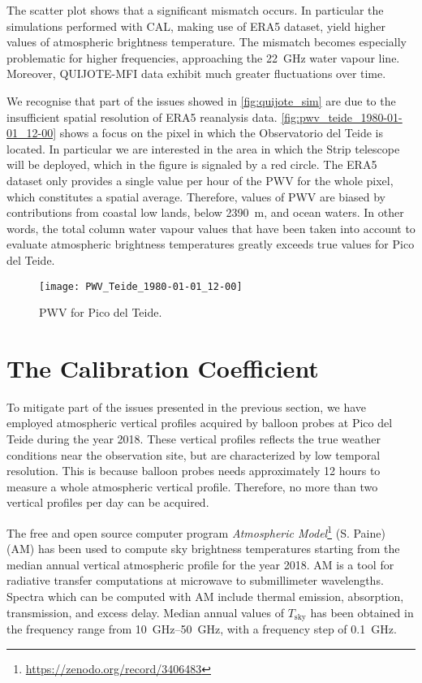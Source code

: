 The scatter plot shows that a significant mismatch occurs. In particular
the simulations performed with CAL, making use of ERA5 dataset, yield higher
values of atmospheric brightness temperature. The mismatch becomes
especially problematic for higher frequencies, approaching the
\SI{22}{\giga\hertz} water vapour line. Moreover, QUIJOTE-MFI data
exhibit much greater fluctuations over time.

We recognise that part of the issues showed in \autoref{fig:quijote_sim}
are due to the insufficient spatial resolution of ERA5 reanalysis data.
\autoref{fig:pwv_teide_1980-01-01_12-00} shows a focus on the pixel in
which the Observatorio del Teide is located. In particular we are
interested in the area in which the Strip telescope will be deployed, which
in the figure is signaled by a red circle. The ERA5 dataset only provides a
single value per hour of the PWV for the whole pixel, which constitutes a
spatial average.  Therefore, values of PWV are biased by contributions from
coastal low lands, below \SI{2390}{\meter}, and ocean waters. In other
words, the total column water vapour values that have been taken into
account to evaluate atmospheric brightness temperatures greatly exceeds
true values for Pico del Teide.

\begin{figure}
        \centering
        \texttt{[image: PWV\_Teide\_1980-01-01\_12-00]}
        \caption{PWV for Pico del Teide.}
        \label{fig:pwv_teide_1980-01-01_12-00}
\end{figure}

\section{The Calibration Coefficient}

To mitigate part of the issues presented in the previous section, we have
employed atmospheric vertical profiles acquired by balloon probes at Pico
del Teide during the year 2018. These vertical profiles reflects the true
weather conditions near the observation site, but are characterized by low
temporal resolution. This is because balloon probes needs approximately
\num{12} hours to measure a whole atmospheric vertical profile. Therefore,
no more than two vertical profiles per day can be acquired.


The free and open source computer program \emph{Atmospheric
Model}\footnote{\url{https://zenodo.org/record/3406483}} (S. Paine) (AM) has
been used to compute sky brightness temperatures starting from the  median
annual vertical atmospheric profile for the year 2018. AM is a tool for
radiative transfer computations at microwave to submillimeter wavelengths.
Spectra which can be computed with AM include thermal emission, absorption,
transmission, and excess delay. Median annual values of $T_\text{sky}$ has
been obtained in the frequency range from \SIrange{10}{50}{\giga\hertz},
with a frequency step of \SI{0.1}{\giga\hertz}.

